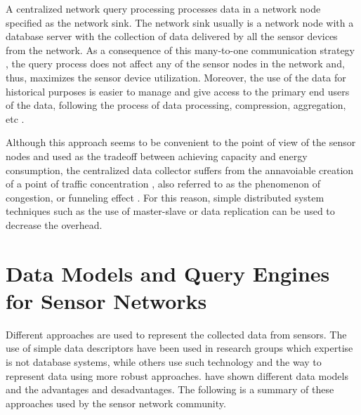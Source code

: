 A centralized network query processing processes data in a network node
specified as the network sink. The network sink usually is a network
node with a database server with the collection of data delivered by
all the sensor devices from the network. As a consequence of this
many-to-one communication strategy \cite{sn-storage02}, the query process does
not affect any of the sensor nodes in the network and, thus, maximizes the
sensor device utilization. Moreover, the use of the data for historical
purposes is easier to manage and give access to the primary end users of the
data, following the process of data processing, compression, aggregation, etc
\cite{sn-db-modeling02}.

Although this approach seems to be convenient to the point of view of the
sensor nodes and used as the tradeoff between achieving capacity and energy
consumption, the centralized data collector suffers from the annavoiable
creation of a point of traffic concentration \cite{sn-storage02}, also referred
to as the phenomenon of congestion, or funneling effect \cite{sn-storage04}.
For this reason, simple distributed system techniques such as the use of
master-slave or data replication can be used to decrease the overhead.

\section{Data Models and Query Engines for Sensor Networks}
\label{sec:data-models}

Different approaches are used to represent the collected data from sensors. The
use of simple data descriptors have been used in research groups which
expertise is not database systems, while others use such technology and the way
to represent data using more robust approaches. \cite{sn-data-model-survey}
have shown different data models and the advantages and desadvantages. The
following is a summary of these approaches used by the sensor network
community.

